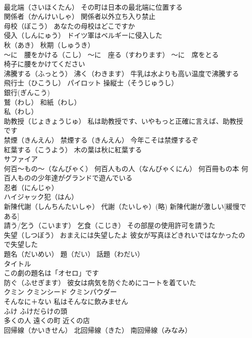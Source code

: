 \documentclass[8pt]{extreport}
\begin{document}
\begin{CJK}{UTF8}{min}
\\	最北端（さいほくたん） その町は日本の最北端に位置する
\\	関係者（かんけいしゃ） 関係者以外立ち入り禁止
\\	母校（ぼこう） あなたの母校はどこですか
\\	侵入（しんにゅう） ドイツ軍はベルギーに侵入した
\\	秋（あき） 秋期（しゅうき）
\\	～に　腰をかける（こし） ～に　座る（すわります） ～に　席をとる　
\\	椅子に腰をかけてください
\\	沸騰する（ふっとう） 沸く（わきます） 牛乳は水よりも高い温度で沸騰する
\\	飛行士（ひこうし） パイロット 操縦士（そうじゅうし）
\\	銀行(ぎんこう)
\\	鷲（わし） 和紙（わし）
\\	私（わし）
\\	助教授（じょきょうじゅ） 私は助教授です、いやもっと正確に言えば、助教授です
\\	禁煙（きんえん） 禁煙する（きんえん） 今年こそは禁煙するぞ
\\	紅葉する（こうよう） 木の葉は秋に紅葉する
\\	サファイア
\\	何百～もの～（なんびゃく） 何百人もの人（なんびゃくにん） 何百冊もの本 何百人ものの少年達がグランドで遊んでいる
\\	忍者（にんじゃ）
\\	ハイジャック犯（はん）
\\	新陳代謝（しんちんたいしゃ） 代謝（たいしゃ）(略) 新陳代謝が激しい[緩慢である]
\\	請う/乞う（こいます） 乞食（こじき） その部屋の使用許可を請うた
\\	失望（しつぼう） おまえには失望したよ 彼女が写真ほどきれいではなかったので失望した
\\	題名（だいめい） 題（だい） 話題（わだい）
\\	タイトル 
\\	この劇の題名は「オセロ」です
\\	防ぐ（ふせぎます） 彼女は病気を防ぐためにコートを着ていた
\\	クミン クミンシード クミンパウダー
\\	そんなに＋ない 私はそんなに飲みません
\\	ふけ ふけだらけの頭
\\	多くの人 遠くの町 近くの店
\\	回帰線（かいきせん） 北回帰線（きた） 南回帰線（みなみ）

\end{CJK}
\end{document}

